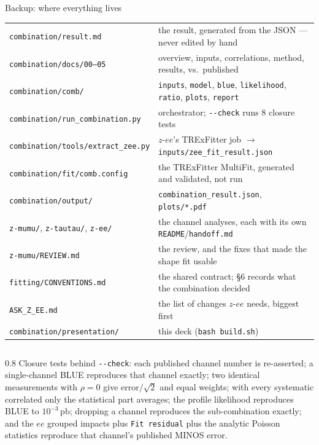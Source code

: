 \documentclass[aspectratio=169,9pt,t]{beamer}
\newcommand{\pb}{\ensuremath{\,\mathrm{pb}}}
\begin{document}
\begin{frame}[noframenumbering]{Backup: where everything lives}
\small
\begin{tabular}{@{}ll@{}}
\toprule
\texttt{combination/result.md} & the result, generated from the JSON --- never edited by hand \\
\texttt{combination/docs/00--05} & overview, inputs, correlations, method, results, vs.\ published \\
\texttt{combination/comb/} & \texttt{inputs}, \texttt{model}, \texttt{blue}, \texttt{likelihood}, \texttt{ratio}, \texttt{plots}, \texttt{report} \\
\texttt{combination/run\_combination.py} & orchestrator; \texttt{-{}-check} runs 8 closure tests \\
\texttt{combination/tools/extract\_zee.py} & $z$-$ee$'s TRExFitter job $\to$ \texttt{inputs/zee\_fit\_result.json} \\
\texttt{combination/fit/comb.config} & the TRExFitter MultiFit, generated and validated, not run \\
\texttt{combination/output/} & \texttt{combination\_result.json}, \texttt{plots/*.pdf} \\ \midrule
\texttt{z-mumu/}, \texttt{z-tautau/}, \texttt{z-ee/} & the channel analyses, each with its own \texttt{README}/\texttt{handoff.md} \\
\texttt{z-mumu/REVIEW.md} & the review, and the fixes that made the shape fit usable \\
\texttt{fitting/CONVENTIONS.md} & the shared contract; \S6 records what the combination decided \\
\texttt{ASK\_Z\_EE.md} & the list of changes $z$-$ee$ needs, biggest first \\
\texttt{combination/presentation/} & this deck (\texttt{bash build.sh}) \\
\bottomrule
\end{tabular}

\vspace{6mm}
\begin{columns}
\begin{column}{0.8\textwidth}\footnotesize
\vspace{-3mm}
Closure tests behind \texttt{-{}-check}: each published channel number is re-asserted; a
single-channel BLUE reproduces that channel exactly; two identical measurements with $\rho = 0$
give error$/\sqrt{2}$ and equal weights; with every systematic correlated only the statistical
part averages; the profile likelihood reproduces BLUE to $10^{-3}\pb$; dropping a channel
reproduces the sub-combination exactly; and the $ee$ grouped impacts plus \texttt{Fit residual}
plus the analytic Poisson statistics reproduce that channel's published MINOS error.
\end{column}
\end{columns}
\end{frame}
\end{document}
